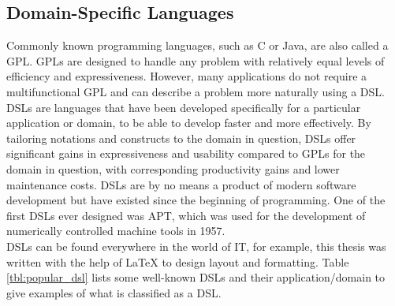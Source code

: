 \subsection{Domain-Specific Languages}
Commonly known programming languages, such as C or Java, are also called a \ac{GPL}. \ac{GPL}s are designed to handle any problem with relatively equal levels of efficiency and expressiveness. However, many applications do not require a multifunctional \ac{GPL} and can describe a problem more naturally using a \ac{DSL}. \ac{DSL}s are languages that have been developed specifically for a particular application or domain, to be able to develop faster and more effectively. \parencite[cf.][p. 1]{hudak_domain-specific_1997}
By tailoring notations and constructs to the domain in question, \ac{DSL}s offer significant gains in expressiveness and usability compared to \ac{GPL}s for the domain in question, with corresponding productivity gains and lower maintenance costs. \parencite[cf.][p. 317]{mernik_when_2005}
\ac{DSL}s are by no means a product of modern software development but have existed since the beginning of programming. One of the first \ac{DSL}s ever designed was \ac{APT}, which was used for the development of numerically controlled machine tools in 1957. \parencite[cf.][pp. 283-284]{wexelblat_origins_1978}\\
\ac{DSL}s can be found everywhere in the world of IT, for example, this thesis was written with the help of \LaTeX{} to design layout and formatting. Table \ref{tbl:popular_dsl} lists some well-known \ac{DSL}s and their application/domain to give examples of what is classified as a \ac{DSL}.

